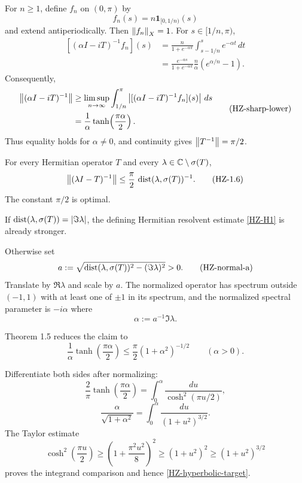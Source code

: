 For $n\ge1$, define $f_n$ on $(0,\pi)$ by
\[
  f_n(s)=n\mathbf1_{[0,1/n)}(s)
  \tag{HZ-testfn}\label{HZ-testfn}
\]
and extend antiperiodically. Then $\left\lVert f_n\right\rVert_X=1$. For $s\in[1/n,\pi)$,
\[
\begin{aligned}
  [(\alpha I-iT)^{-1}f_n](s)
  &=\frac{n}{1+e^{-\alpha\pi}}
      \int_{s-1/n}^{s}e^{-\alpha t}\,dt\\
  &=\frac{e^{-\alpha s}}{1+e^{-\alpha\pi}}
      \frac{n}{\alpha}(e^{\alpha/n}-1).
\end{aligned}
\tag{HZ-test-image}\label{HZ-test-image}
\]
Consequently,
\[
\begin{aligned}
 \left\lVert (\alpha I-iT)^{-1}\right\rVert
 &\ge\limsup_{n\to\infty}
      \int_{1/n}^{\pi}
      \left\lvert [(\alpha I-iT)^{-1}f_n](s)\right\rvert\,ds\\
 &=\frac1\alpha\tanh\!\left(\frac{\pi\alpha}{2}\right).
\end{aligned}
\tag{HZ-sharp-lower}\label{HZ-sharp-lower}
\]
Thus equality holds for $\alpha\ne0$, and continuity gives $\left\lVert T^{-1}\right\rVert=\pi/2$.

\begin{corollary}
For every Hermitian operator $T$ and every $\lambda\in\mathbb{C}\setminus\sigma(T)$,
\[
  \left\lVert (\lambda I-T)^{-1}\right\rVert
  \le \frac\pi2\,\operatorname{dist}(\lambda,\sigma(T))^{-1}.
  \tag{HZ-1.6}\label{HZ-1.6}
\]
The constant $\pi/2$ is optimal.
\end{corollary}

\begin{proofoutline}
\item If $\operatorname{dist}(\lambda,\sigma(T))=\left\lvert \Im\lambda\right\rvert$, the defining Hermitian resolvent estimate \eqref{HZ-H1} is already stronger.
\item Otherwise set
\[
  a:=\sqrt{\operatorname{dist}(\lambda,\sigma(T))^2-(\Im\lambda)^2}>0.
  \tag{HZ-normal-a}\label{HZ-normal-a}
\]
Translate by $\Re\lambda$ and scale by $a$. The normalized operator has spectrum outside $(-1,1)$ with at least one of $\pm1$ in its spectrum, and the normalized spectral parameter is $-i\alpha$ where
\[
  \alpha:=a^{-1}\Im\lambda.
  \tag{HZ-normal-alpha}\label{HZ-normal-alpha}
\]
\item Theorem 1.5 reduces the claim to
\[
  \frac1\alpha\tanh\!\left(\frac{\pi\alpha}{2}\right)
  \le \frac\pi2(1+\alpha^2)^{-1/2}
  \qquad(\alpha>0).
  \tag{HZ-hyperbolic-target}\label{HZ-hyperbolic-target}
\]
\item Differentiate both sides after normalizing:
\[
  \frac2\pi\tanh\!\left(\frac{\pi\alpha}{2}\right)
  =\int_0^\alpha\frac{du}{\cosh^2(\pi u/2)},
  \tag{HZ-hyperbolic-int}\label{HZ-hyperbolic-int}
\]
\[
  \frac{\alpha}{\sqrt{1+\alpha^2}}
  =\int_0^\alpha\frac{du}{(1+u^2)^{3/2}}.
  \tag{HZ-algebraic-int}\label{HZ-algebraic-int}
\]
The Taylor estimate
\[
  \cosh^2\!\left(\frac{\pi u}{2}\right)
  \ge\left(1+\frac{\pi^2u^2}{8}\right)^2
  \ge(1+u^2)^2
  \ge(1+u^2)^{3/2}
  \tag{HZ-denom-compare}\label{HZ-denom-compare}
\]
proves the integrand comparison and hence \eqref{HZ-hyperbolic-target}.
\end{proofoutline}

